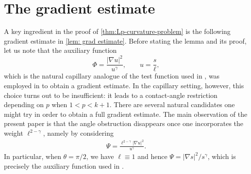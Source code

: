 \documentclass[12pt]{amsart}
\numberwithin{equation}{section}
\newcommand{\8}{\infty}
\newcommand{\eq}[1]{\begin{equation}\begin{alignedat}{2}#1\end{alignedat}\end{equation}}
\begin{document}
\section{The gradient estimate}
A key ingredient in the proof of \autoref{thm:Lp-curvature-problem} is the following gradient estimate in \autoref{lem: grad estimate}. Before stating the lemma and its proof, let us note that the auxiliary function
\[
\Phi=\frac{|\nabla u|^2}{u^{\gamma}}, \qquad u=\frac{s}{\ell},
\]
which is the natural capillary analogue of the test function used in \cite{HI24}, was employed in \cite{MWW25d} to obtain a gradient estimate. In the capillary setting, however, this choice turns out to be insufficient: it leads to a contact-angle restriction depending on $p$ when $1<p<k+1$. There are several natural candidates one might try in order to obtain a full gradient estimate. The main observation of the present paper is that the angle obstruction disappears once one incorporates the weight $\ell^{2-\gamma }$, namely by considering
\eq{\label{eq: defn-auxillary}
\Psi= \frac{\ell^{2-\gamma}|\nabla u|^2}{u^{\gamma}}.
}
In particular, when $\theta=\pi/2$, we have $\ell\equiv 1$ and hence $\Psi=|\nabla s|^2/s^{\gamma}$, which is precisely the auxiliary function used in \cite{HI24}.
\end{document}
